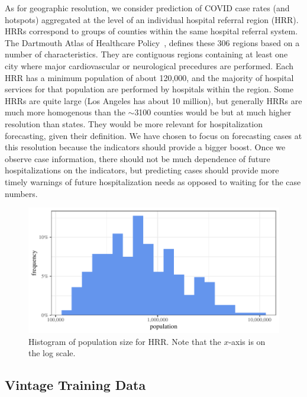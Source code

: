 \documentclass[9pt,twocolumn,twoside,lineno]{pnas-new}
\begin{document}
As for geographic resolution, we consider prediction of COVID case rates (and
hotspots) aggregated at the level of an individual hospital referral region
(HRR). HRRs correspond to groups of counties within the same hospital referral
system. The Dartmouth Atlas of Healthcare Policy~\cite{DartmouthHRR}, defines
these 306 regions based on a number of characteristics. They are contiguous
regions containing at least one city where major cardiovascular or neurological
precedures are performed. Each HRR has a minimum population of about 120,000, and
the majority of hospital services for that population are performed by hospitals
within the region. Some HRRs are quite large (Los Angeles has
about 10 million), but generally HRRs are much more homogenous than the
$\sim$3100 counties 
would be but at much higher resolution than states. They would be more relevant for
hospitalization forecasting, given their definition. We have chosen to focus on
forecasting cases at this resolution because the indicators should provide a
bigger boost. Once we observe case information, there should not be much
dependence of future
hospitalizations on the indicators, but predicting cases should provide more timely
warnings of future hospitalization needs as opposed to waiting for the case
numbers. 

\begin{figure}
  \centering
  \includegraphics[width=\linewidth]{fig/hrr_pop_histogram.pdf}
  \caption{Histogram of population size for HRR. Note that the $x$-axis is on
    the log scale.}
  \label{fig:hrr-histogram}
\end{figure}

\subsection{Vintage Training Data}

\end{document}
